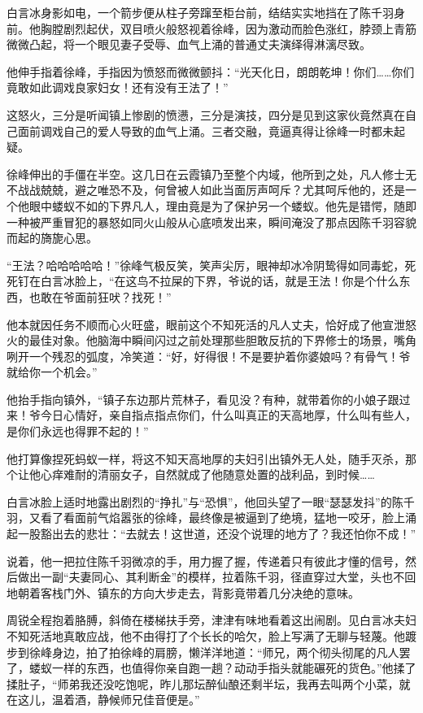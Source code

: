 白言冰身影如电，一个箭步便从柱子旁蹿至柜台前，结结实实地挡在了陈千羽身前。他胸膛剧烈起伏，双目喷火般怒视着徐峰，因为激动而脸色涨红，脖颈上青筋微微凸起，将一个眼见妻子受辱、血气上涌的普通丈夫演绎得淋漓尽致。

他伸手指着徐峰，手指因为愤怒而微微颤抖：“光天化日，朗朗乾坤！你们……你们竟敢如此调戏良家妇女！还有没有王法了！”

这怒火，三分是听闻镇上惨剧的愤懑，三分是演技，四分是见到这家伙竟然真在自己面前调戏自己的爱人导致的血气上涌。三者交融，竟逼真得让徐峰一时都未起疑。

徐峰伸出的手僵在半空。这几日在云霞镇乃至整个内域，他所到之处，凡人修士无不战战兢兢，避之唯恐不及，何曾被人如此当面厉声呵斥？尤其呵斥他的，还是一个他眼中蝼蚁不如的下界凡人，理由竟是为了保护另一个蝼蚁。他先是错愕，随即一种被严重冒犯的暴怒如同火山般从心底喷发出来，瞬间淹没了那点因陈千羽容貌而起的旖旎心思。

“王法？哈哈哈哈哈！”徐峰气极反笑，笑声尖厉，眼神却冰冷阴鸷得如同毒蛇，死死钉在白言冰脸上，“在这鸟不拉屎的下界，爷说的话，就是王法！你是个什么东西，也敢在爷面前狂吠？找死！”

他本就因任务不顺而心火旺盛，眼前这个不知死活的凡人丈夫，恰好成了他宣泄怒火的最佳对象。他脑海中瞬间闪过之前处理那些胆敢反抗的下界修士的场景，嘴角咧开一个残忍的弧度，冷笑道：“好，好得很！不是要护着你婆娘吗？有骨气！爷就给你一个机会。”

他抬手指向镇外，“镇子东边那片荒林子，看见没？有种，就带着你的小娘子跟过来！爷今日心情好，亲自指点指点你们，什么叫真正的天高地厚，什么叫有些人，是你们永远也得罪不起的！”

他打算像捏死蚂蚁一样，将这不知天高地厚的夫妇引出镇外无人处，随手灭杀，那个让他心痒难耐的清丽女子，自然就成了他随意处置的战利品，到时候……

白言冰脸上适时地露出剧烈的“挣扎”与“恐惧”，他回头望了一眼“瑟瑟发抖”的陈千羽，又看了看面前气焰嚣张的徐峰，最终像是被逼到了绝境，猛地一咬牙，脸上涌起一股豁出去的悲壮：“去就去！这世道，还没个说理的地方了？我还怕你不成！”

说着，他一把拉住陈千羽微凉的手，用力握了握，传递着只有彼此才懂的信号，然后做出一副“夫妻同心、其利断金”的模样，拉着陈千羽，径直穿过大堂，头也不回地朝着客栈门外、镇东的方向大步走去，背影竟带着几分决绝的意味。

周锐全程抱着胳膊，斜倚在楼梯扶手旁，津津有味地看着这出闹剧。见白言冰夫妇不知死活地真敢应战，他不由得打了个长长的哈欠，脸上写满了无聊与轻蔑。他踱步到徐峰身边，拍了拍徐峰的肩膀，懒洋洋地道：“师兄，两个彻头彻尾的凡人罢了，蝼蚁一样的东西，也值得你亲自跑一趟？动动手指头就能碾死的货色。”他揉了揉肚子，“师弟我还没吃饱呢，昨儿那坛醉仙酿还剩半坛，我再去叫两个小菜，就在这儿，温着酒，静候师兄佳音便是。”

